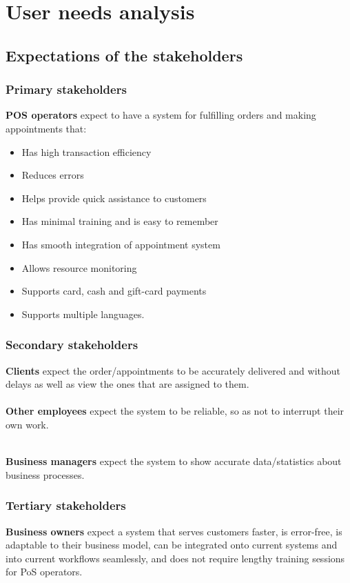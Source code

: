 \documentclass{article}
\begin{document}
\section{User needs analysis}
\subsection{Expectations of the stakeholders}
\subsubsection{Primary stakeholders}
\textbf{POS operators} expect to have a system for fulfilling orders and making appointments that:
\begin{itemize}
    \item Has high transaction efficiency
    \item Reduces errors
    \item Helps provide quick assistance to customers
    \item Has minimal training and is easy to remember
    \item Has smooth integration of appointment system
    \item Allows resource monitoring
    \item Supports card, cash and gift-card payments
    \item Supports multiple languages.
\end{itemize}


\subsubsection{Secondary stakeholders}

\textbf{Clients} expect the order/appointments to be accurately delivered and without delays as well as view the ones that are assigned to them. \\ 
\textbf{\\ Other employees} expect the system to be reliable, so as not to interrupt their own work.

\textbf{\\ Business managers} expect the system to show accurate data/statistics about business processes.

\subsubsection{Tertiary stakeholders}

\textbf{Business owners} expect a system that serves customers faster, is error-free, is adaptable to their business model, can be integrated onto current systems and into current workflows seamlessly, and does not require lengthy training sessions for PoS operators.
\end{document}
